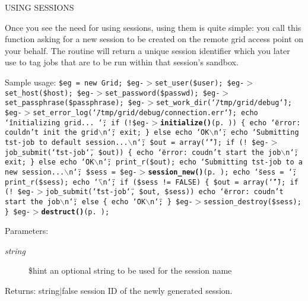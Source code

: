 USING SESSIONS

Once you see the need for using sessions, using them is quite simple: you call this function asking for a new session to be created on the remote grid access point on your behalf. The routine will return a unique session identifier which you later use to tag jobs that are to be run within that session's sandbox.

Sample usage: {\tt  \$eg = new Grid; \$eg-$>$set\_\-user(\$user); \$eg-$>$set\_\-host(\$host); \$eg-$>$set\_\-password(\$passwd); \$eg-$>$set\_\-passphrase(\$passphrase); \$eg-$>$set\_\-work\_\-dir(\char`\"{}/tmp/grid/debug\char`\"{}); \$eg-$>$set\_\-error\_\-log(\char`\"{}/tmp/grid/debug/connection.err\char`\"{}); echo \char`\"{}initializing grid... \char`\"{}; if (!\$eg-$>${\bf initialize()}{\rm (p.\,\pageref{classGrid_a11})}) \{ echo \char`\"{}error: couldn't init the grid$\backslash$n\char`\"{}; exit; \} else echo \char`\"{}OK$\backslash$n\char`\"{}; echo \char`\"{}Submitting tst-job to default session...$\backslash$n\char`\"{}; \$out = array(\char`\"{}\char`\"{}); if (! \$eg-$>$job\_\-submit(\char`\"{}tst-job\char`\"{}, \$out)) \{ echo \char`\"{}error: coudn't start the job$\backslash$n\char`\"{}; exit; \} else echo \char`\"{}OK$\backslash$n\char`\"{}; print\_\-r(\$out); echo \char`\"{}Submitting tst-job to a new session...$\backslash$n\char`\"{}; \$sess = \$eg-$>${\bf session\_\-new()}{\rm (p.\,\pageref{classGrid_a13})}; echo \char`\"{}sess = \char`\"{}; print\_\-r(\$sess); echo \char`\"{}$\backslash$n\char`\"{}; if (\$sess != FALSE) \{ \$out = array(\char`\"{}\char`\"{}); if (! \$eg-$>$job\_\-submit(\char`\"{}tst-job\char`\"{}, \$out, \$sess)) echo \char`\"{}error: coudn't start the job$\backslash$n\char`\"{}; else \{ echo \char`\"{}OK$\backslash$n\char`\"{}; \} \$eg-$>$session\_\-destroy(\$sess); \} \$eg-$>${\bf destruct()}{\rm (p.\,\pageref{classGrid_a1})}; }

\begin{Desc}
\item[Parameters:]
\begin{description}
\item[{\em string}]\$hint an optional string to be used for the session name\end{description}
\end{Desc}
\begin{Desc}
\item[Returns:]string$|$false session ID of the newly generated session. \end{Desc}


